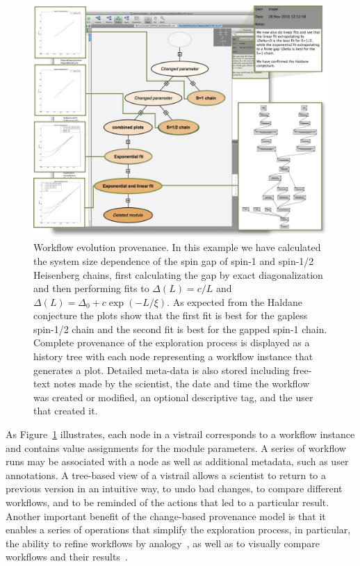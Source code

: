 \documentclass[12pt]{iopart}
\begin{document}
\begin{figure}[t]
\centering
\begin{center}
 \includegraphics[width = 1.0\linewidth,clip=false]{figures/alps_tree.png}
 \caption{Workflow evolution provenance. 
 In this example we have calculated the system size dependence of the spin gap of spin-1 and spin-1/2 Heisenberg chains, first calculating the gap by exact diagonalization and then performing fits to $\Delta(L)= c/L$ and $\Delta(L)= \Delta_0 + c \exp(-L/\xi)$. As expected from the Haldane conjecture the plots show that the first fit is best for the gapless spin-1/2 chain and the second fit is best for the gapped spin-1 chain.
 Complete provenance of the exploration process is
 displayed as a history tree with each node representing a workflow
 instance that generates a plot. Detailed meta-data is
 also stored including free-text notes made by the scientist, the
 date and time the workflow was created or modified, an optional
 descriptive tag, and the user that created it.} \label{fig:alps-tree}
 \vspace{-.3cm}
\end{center}
\end{figure}

As Figure~\ref{fig:alps-tree} illustrates, each node in a vistrail
corresponds to a workflow instance and contains value assignments for
the module parameters. A series of workflow runs may be associated
with a node as well as additional metadata, such as user annotations.
A tree-based view of a vistrail allows a scientist to return to a
previous version in an intuitive way, to undo bad changes, to compare
different workflows, and to be reminded of the actions that led to a
particular result. Another important benefit of the change-based
provenance model is that it enables a series of operations that
simplify the exploration process, in particular, the ability to refine
workflows by analogy~\cite{analogies@tvcg2007}, as well as to visually
compare workflows and their results~\cite{Freire:2006:IPAW}.
\end{document}
